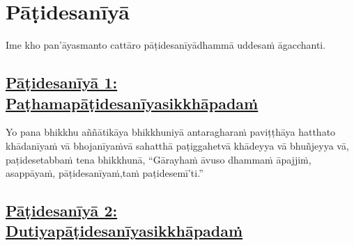 
\section{Pāṭidesanīyā}
\label{pd}

\begin{intro}
	Ime kho pan'āyasmanto cattāro pāṭidesanīyā\makeatletter\hyperlink{endnote438-appendix}\makeatother \thinspace dhammā uddesaṁ āgacchanti.
\end{intro}

\setsubsecheadstyle{\subsubsectionFmt}
\subsection*{\hyperref[ack1]{Pāṭidesanīyā 1: Paṭhamapāṭidesanīyasikkhāpadaṁ}}
\label{pd1}

Yo pana bhikkhu aññātikāya bhikkhuniyā antaragharaṁ paviṭṭhāya hatthato khādanīyaṁ vā bhojanīyaṁ\makeatletter\hyperlink{endnote439-appendix}\makeatother \thinspace vā sahatthā paṭiggahetvā khādeyya vā bhuñjeyya vā, paṭidesetabbaṁ tena bhikkhunā, ``Gārayhaṁ āvuso dhammaṁ āpajjiṁ, asappāyaṁ, pāṭidesanīyaṁ,\makeatletter\hyperlink{endnote440-appendix}\makeatother \thinspace taṁ paṭidesemī'ti.''\makeatletter\hyperlink{endnote441-appendix}\makeatother \thinspace



\subsection*{\hyperref[ack2]{Pāṭidesanīyā 2: Dutiyapāṭidesanīyasikkhāpadaṁ}}
\label{pd2}

